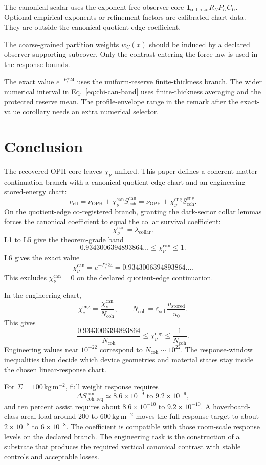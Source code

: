 \documentclass[11pt]{article}
\numberwithin{equation}{section}
\theoremstyle{remark}
\newcommand{\chinu}{\chi_\nu}
\newcommand{\chican}{\chi_\nu^{\mathrm{can}}}
\newcommand{\chieng}{\chi_\nu^{\mathrm{eng}}}
\newcommand{\scohcan}{S_{\mathrm{coh}}^{\mathrm{can}}}
\newcommand{\scoheng}{S_{\mathrm{coh}}^{\mathrm{eng}}}
\newcommand{\Ncoh}{N_{\mathrm{coh}}}
\newcommand{\nueff}{\nu_{\mathrm{eff}}}
\newcommand{\nuoph}{\nu_{\mathrm{OPH}}}
\newcommand{\eps}{\varepsilon}
\newcommand{\lambdac}{\lambda_{\mathrm{collar}}}
\begin{document}
The canonical scalar uses the exponent-free observer core
\(\mathbf 1_{\mathrm{self\mbox{-}read}}R_UP_UC_U\). Optional empirical
exponents or refinement factors are calibrated-chart data. They are outside
the canonical quotient-edge coefficient.

The coarse-grained partition weights \(w_U(x)\) should be induced by a declared
observer-supporting subcover. Only the contrast entering the force law is used
in the response bounds.

The exact value \(e^{-P/24}\) uses the uniform-reserve finite-thickness branch.
The wider numerical interval in Eq.~\eqref{eq:chi-can-band} uses finite-thickness
averaging and the protected reserve mean. The profile-envelope range in the
remark after the exact-value corollary needs an extra numerical selector.

\section{Conclusion}

The recovered OPH core leaves \(\chinu\) unfixed. This paper defines a
coherent-matter continuation branch with a canonical quotient-edge chart and an
engineering stored-energy chart:
\[
\nueff
=
\nuoph+\chican\scohcan
=
\nuoph+\chieng\scoheng.
\]
On the quotient-edge co-registered branch, granting the dark-sector collar
lemmas forces the canonical coefficient to equal the collar survival
coefficient:
\[
\chican=\lambdac.
\]
L1 to L5 give the theorem-grade band
\[
0.9343006394893864\ldots
\le
\chican
\le
1.
\]
L6 gives the exact value
\[
\chican=e^{-P/24}=0.9343006394893864\ldots .
\]
This excludes \(\chican=0\) on the declared quotient-edge continuation.

In the engineering chart,
\[
\chieng=\frac{\chican}{\Ncoh},
\qquad
\Ncoh=\eps_{\mathrm{sub}}\frac{u_{\mathrm{stored}}}{u_0}.
\]
This gives
\[
\frac{0.9343006394893864}{\Ncoh}
\le
\chieng
\le
\frac{1}{\Ncoh}.
\]
Engineering values near \(10^{-22}\) correspond to
\(\Ncoh\sim10^{22}\). The response-window inequalities then decide which
device geometries and material states stay inside the chosen linear-response
chart.

For \(\Sigma=100\,\mathrm{kg\,m^{-2}}\), full weight response requires
\[
\Delta S_{\mathrm{coh,req}}^{\mathrm{can}}
\simeq
8.6\times10^{-9}\text{ to }9.2\times10^{-9},
\]
and ten percent assist requires about \(8.6\times10^{-10}\) to
\(9.2\times10^{-10}\). A hoverboard-class areal load around
\(200\) to \(600\,\mathrm{kg\,m^{-2}}\) moves the full-response target to about
\(2\times10^{-8}\) to \(6\times10^{-8}\). The coefficient is compatible with
those room-scale response levels on the declared branch. The engineering task
is the construction of a substrate that produces the required vertical
canonical contrast with stable controls and acceptable losses.
\end{document}
